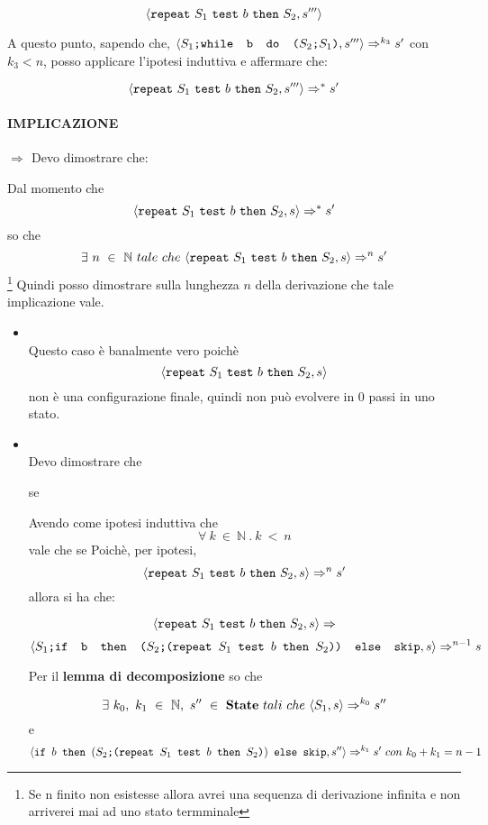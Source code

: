 {\begin{itemize}
		\[ \langle{}\texttt{repeat}~S_1~\texttt{test}~b~\texttt{then}~S_2, s'''\rangle{} \]

		A questo punto, sapendo che,
		$\langle{}\textrm{\normalfont{\texttt{$S_1$;\mbox{\normalfont{\texttt{while }}} b \textrm{\normalfont{\texttt{ do }}} (\textrm{\normalfont{\texttt{$S_2$;$S_1$}}})}}}, s'''\rangle{}
		\Rightarrow^{k_3}s'$ con $k_3<n$, posso applicare l'ipotesi induttiva e affermare che:
	
		\[ \langle{}\texttt{repeat}~S_1~\texttt{test}~b~\texttt{then}~S_2, s'''\rangle{}\Rightarrow^{*}s' \]
		
	\end{itemize}

	\paragraph{IMPLICAZIONE} \textbf{\Large{$\Longrightarrow$ }} 
	Devo dimostrare che:
	\begin{center}
	\exThreeLtR{}
	\end{center}
	
	Dal momento che 
	\[ \langle{}\texttt{repeat}~S_1~\texttt{test}~b~\texttt{then}~S_2, s\rangle{}\Rightarrow^{*}s' \]
	 so che
	\[ \exists{}~n~\in~\mathbb{N}~tale~che~
	\langle{}\texttt{repeat}~S_1~\texttt{test}~b~\texttt{then}~S_2, s\rangle{}\Rightarrow^{n}s' \]\footnote{Se n finito non esistesse allora avrei una sequenza di derivazione infinita e non arriverei mai ad uno stato termminale }
	Quindi posso dimostrare sulla
	lunghezza $n$ della derivazione che tale implicazione vale.

	\begin{itemize}
\item {} \\
	Questo caso è banalmente vero poichè 
\[ \langle{}\texttt{repeat}~S_1~\texttt{test}~b~\texttt{then}~S_2, s\rangle{} \]
	non è una configurazione finale,
	quindi non può evolvere in 0 passi in uno stato.
		
\item {} \\
	 Devo dimostrare che 
	\begin{center}
	se 
	\end{center}
	Avendo come ipotesi induttiva che 
	\[ \forall{}~k~\in~\mathbb{N}~.~k~<~n  \]vale che se 
	Poichè, per ipotesi, \[ \langle{}\texttt{repeat}~S_1~\texttt{test}~b~\texttt{then}~S_2, s\rangle{}\Rightarrow^{n}s' \] allora
	si ha che:

\[ 	\langle{}\texttt{repeat}~S_1~\texttt{test}~b~\texttt{then}~S_2, s\rangle{}\Rightarrow^{}   \]
\[	\langle{}\textrm{\normalfont{\texttt{$S_1$;\mbox{\normalfont{\texttt{if }}} b \textrm{\normalfont{\texttt{ then }}} (\textrm{\normalfont{\texttt{$S_2$;(\texttt{repeat}~$S_1$~\texttt{test}~$b$~\texttt{then}~$S_2$)}}}) \textrm{\normalfont{\texttt{ else }}} \textrm{\normalfont{\texttt{skip}}}}}}, s\rangle{}\Rightarrow^{n-1}s \]

	Per il \textbf{lemma di decomposizione} so che 

\[ 	\exists{}~k_0,~k_1~\in~
	\mathbb{N},~s''~\in~\mbox{\textbf{State}}{}~tali~che~\langle{}S_1, s\rangle{}\Rightarrow^{k_0}s'' \] e 
\[ 	\langle{}\mbox{\normalfont{\texttt{if }}} b \textrm{\normalfont{\texttt{ then }}} (\textrm{\normalfont{\texttt{$S_2$;(\texttt{repeat}~$S_1$~\texttt{test}~$b$~\texttt{then}~$S_2$)}}}) \textrm{\normalfont{\texttt{ else }}} \textrm{\normalfont{\texttt{skip}}}, s''\rangle{}\Rightarrow^{k_1}s'~con~k_0+k_1=n-1 \]


\end{itemize}}
